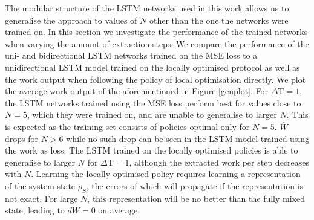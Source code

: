 The modular structure of the LSTM networks used in this work allows us to generalise the approach to values of $N$ other than the one the networks were trained on.
In this section we investigate the performance of the trained networks when varying the amount of extraction steps.
We compare the performance of the uni- and bidirectional LSTM networks trained on the MSE loss to a unidirectional LSTM model trained on the locally optimised protocol as well as the work output when following the policy of local optimisation directly.
We plot the average work output of the aforementioned in Figure \ref{genplot}.
For $\Delta \mathrm{T} = 1$, the LSTM networks trained using the MSE loss perform best for values close to $N=5$, which they were trained on, and are unable to generalise to larger $N$.
This is expected as the training set consists of policies optimal only for $N=5$.
$\overline{W}$ drops for $N > 6$ while no such drop can be seen in the LSTM model trained using the work as loss.
The LSTM trained on the locally optimised policies is able to generalise to larger $N$ for $\Delta \mathrm{T} = 1$, although the extracted work per step decreases with $N$.
Learning the locally optimised policy requires learning a representation of the system state $\rho_S$, the errors of which will propagate if the representation is not exact.
For large $N$, this representation will be no better than the fully mixed state, leading to $dW = 0$ on average.

